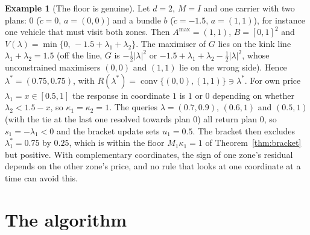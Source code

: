 \documentclass[11pt]{article}
\theoremstyle{definition}
\newtheorem{example}[theorem]{Example}
\theoremstyle{remark}
\newcommand{\Amax}{A^{\max}}
\newcommand{\conv}{\operatorname{conv}}
\begin{document}
\begin{example}[The floor is genuine]\label{ex:kappa}
Let $d=2$, $M=I$ and one carrier with two plans: $0$ ($\tilde c=0$, $a=(0,0)$) and a bundle $b$ ($\tilde c=-1.5$, $a=(1,1)$), for instance one vehicle that must visit both zones. Then $\Amax=(1,1)$, $B=[0,1]^2$ and $V(\lambda)=\min\{0,\,-1.5+\lambda_1+\lambda_2\}$. The maximiser of $G$ lies on the kink line $\lambda_1+\lambda_2=1.5$ (off the line, $G$ is $-\frac12|\lambda|^2$ or $-1.5+\lambda_1+\lambda_2-\frac12|\lambda|^2$, whose unconstrained maximisers $(0,0)$ and $(1,1)$ lie on the wrong side). Hence $\lambda^*=(0.75,0.75)$, with $R(\lambda^*)=\conv\{(0,0),(1,1)\}\ni\lambda^*$. For own price $\lambda_1=x\in[0.5,1]$ the response in coordinate $1$ is $1$ or $0$ depending on whether $\lambda_2<1.5-x$, so $\kappa_1=\kappa_2=1$. The queries $\lambda=(0.7,0.9)$, $(0.6,1)$ and $(0.5,1)$ (with the tie at the last one resolved towards plan $0$) all return plan $0$, so $s_1=-\lambda_1<0$ and the bracket update sets $u_1=0.5$. The bracket then excludes $\lambda^*_1=0.75$ by $0.25$, which is within the floor $M_1\kappa_1=1$ of Theorem~\ref{thm:bracket} but positive. With complementary coordinates, the sign of one zone's residual depends on the other zone's price, and no rule that looks at one coordinate at a time can avoid this.
\end{example}

\section{The algorithm}\label{sec:alg}
\end{document}

